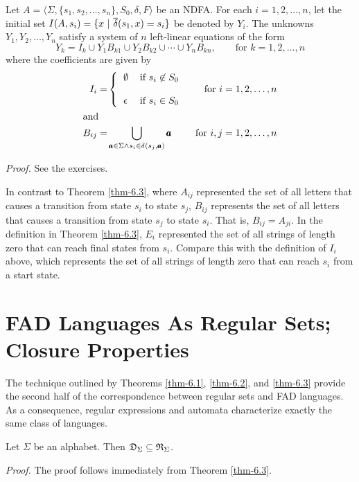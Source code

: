 \begin{lmm}\label{lmm-6.4}
Let $A=\langle\Sigma,\{s_1,s_2,\ldots,s_n\},S_0,\delta,F\rangle$ be an NDFA. For
each $i=1,2,\ldots,n$, let the initial set $I(A,s_i)=\{x\ |\ \DBAR(s_1,x) = s_i\}$
be denoted by $Y_i$. The unknowns $Y_1,Y_2,\ldots,Y_n$ satisfy a system of $n$
left-linear equations of the form
\[ Y_k = I_k \cup Y_1B_{k1} \cup Y_2B_{k2} \cup\cdots\cup Y_nB_{kn},\qquad
	\text{for }k = 1,2,\ldots,n \]
where the coefficients are given by
\begin{align*}
I_i = & \left\{ \begin{tabular}{ll}
			$\emptyset$ & if $s_i \not \in S_0$ \\
			& \\
			$\epsilon$ & if $s_i \in S_0$
		 \end{tabular}\right. &
		 \text{for }i = 1,2,\ldots,n \\
\intertext{and}
B_{ij} = & \bigcup\limits_{\pmb{a}\in \Sigma \wedge s_i\in \delta(s_j,
	\pmb{a})} \pmb{a} & \text{for }i,j=1,2, \ldots ,n
\end{align*}

\emph{Proof.} See the exercises.
\end{lmm}

In contrast to Theorem \ref{thm-6.3}, where $A_{ij}$ represented the set of all letters
that causes a transition from state $s_i$ to state $s_j$, $B_{ij}$ represents
the set of all letters that causes a transition from state $s_j$ to state $s_i$.
That is, $B_{ij} = A_{ji}$. In the definition in Theorem \ref{thm-6.3}, $E_i$ represented
the set of all strings of length zero that can reach final states from $s_i$.
Compare this with the definition of $I_i$ above, which represents the set of all
strings of length zero that can reach $s_i$ from a start state.

\section{FAD Languages As Regular Sets; Closure Properties}\label{sec-6.4}

The technique outlined by Theorems \ref{thm-6.1}, \ref{thm-6.2}, and \ref{thm-6.3}
provide the second half of the correspondence between regular sets and FAD
languages. As a consequence, regular expressions and automata characterize
exactly the same class of languages.

\begin{cor}\label{cor-6.2}
Let $\Sigma$ be an alphabet. Then $\mathfrak{D}_\Sigma \subseteq \mathfrak{R}_\Sigma$.

\emph{Proof.} The proof follows immediately from Theorem \ref{thm-6.3}.
\end{cor}

